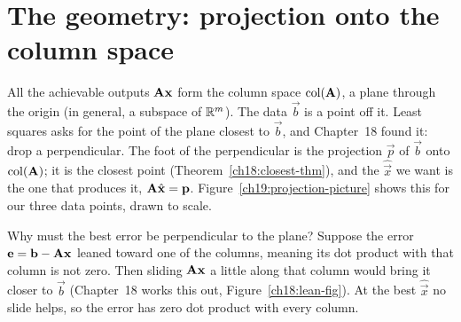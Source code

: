 \section{The geometry: projection onto the column space}

All the achievable outputs $\mathbf{A}\mathbf{x}$ form the column space $\operatorname{col}(\mathbf{A})$, a plane through
the origin (in general, a subspace of $\mathbb{R}^m$). The data $\vec{b}$ is a point off it. Least squares
asks for the point of the plane closest to $\vec{b}$, and Chapter~18 found it: drop a perpendicular.
The foot of the perpendicular is the projection $\vec{p}$ of $\vec{b}$ onto $\operatorname{col}(\mathbf{A})$; it is
the closest point (Theorem~\ref{ch18:closest-thm}), and the $\hat{\vec{x}}$ we want is the one that
produces it, $\mathbf{A}\hat{\mathbf{x}}=\mathbf{p}$. Figure~\ref{ch19:projection-picture} shows this for our
three data points, drawn to scale.

Why must the best error be perpendicular to the plane? Suppose the error $\mathbf{e}=\mathbf{b}-\mathbf{A}\mathbf{x}$
leaned toward one of the columns, meaning its dot product with that column is not zero. Then
sliding $\mathbf{A}\mathbf{x}$ a little along that column would bring it closer to $\vec{b}$ (Chapter~18
works this out, Figure~\ref{ch18:lean-fig}). At the best $\hat{\vec{x}}$ no slide helps, so the
error has zero dot product with every column.

